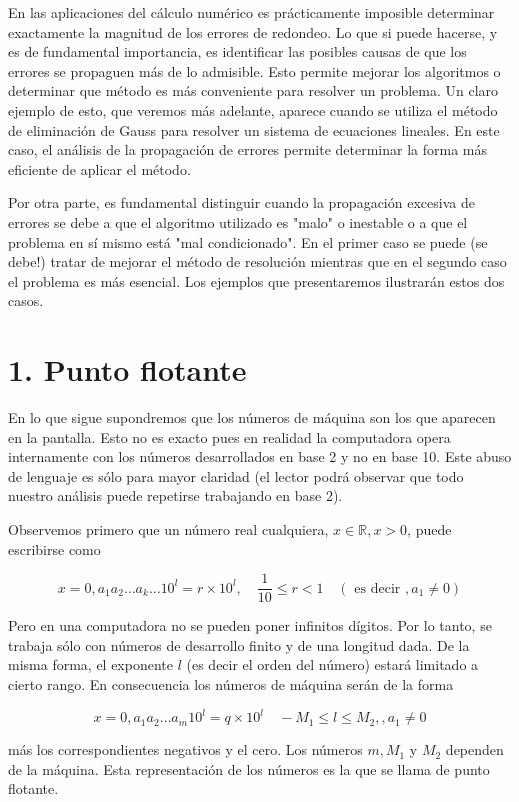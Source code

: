 \documentclass[10pt]{article}
\begin{document}
En las aplicaciones del cálculo numérico es prácticamente imposible determinar exactamente la magnitud de los errores de redondeo. Lo que si puede hacerse, y es de fundamental importancia, es identificar las posibles causas de que los errores se propaguen más de lo admisible. Esto permite mejorar los algoritmos o determinar que método es más conveniente para resolver un problema. Un claro ejemplo de esto, que veremos más adelante, aparece cuando se utiliza el método de eliminación de Gauss para resolver un sistema de ecuaciones lineales. En este caso, el análisis de la propagación de errores permite determinar la forma más eficiente de aplicar el método.

Por otra parte, es fundamental distinguir cuando la propagación excesiva de errores se debe a que el algoritmo utilizado es "malo" o inestable o a que el problema en sí mismo está "mal condicionado". En el primer caso se puede (se debe!) tratar de mejorar el método de resolución mientras que en el segundo caso el problema es más esencial. Los ejemplos que presentaremos ilustrarán estos dos casos.

\section*{1. Punto flotante}
En lo que sigue supondremos que los números de máquina son los que aparecen en la pantalla. Esto no es exacto pues en realidad la computadora opera internamente con los números desarrollados en base 2 y no en base 10. Este abuso de lenguaje es sólo para mayor claridad (el lector podrá observar que todo nuestro análisis puede repetirse trabajando en base 2).

Observemos primero que un número real cualquiera, $x \in \mathbb{R}, x>0$, puede escribirse como

$$
x=0, a_{1} a_{2} \ldots a_{k} \ldots 10^{l}=r \times 10^{l}, \quad \frac{1}{10} \leq r<1 \quad\left(\text { es decir }, a_{1} \neq 0\right)
$$

Pero en una computadora no se pueden poner infinitos dígitos. Por lo tanto, se trabaja sólo con números de desarrollo finito y de una longitud dada. De la misma forma, el exponente $l$ (es decir el orden del número) estará limitado a cierto rango. En consecuencia los números de máquina serán de la forma

$$
x=0, a_{1} a_{2} \ldots a_{m} 10^{l}=q \times 10^{l} \quad-M_{1} \leq l \leq M_{2},, a_{1} \neq 0
$$

más los correspondientes negativos y el cero. Los números $m, M_{1}$ y $M_{2}$ dependen de la máquina. Esta representación de los números es la que se llama de punto flotante.
\end{document}
